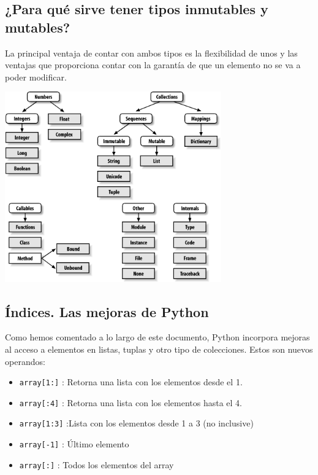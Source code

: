 \documentclass[12pt]{article} %
\begin{document}
\subsection{¿Para qué sirve tener tipos inmutables y mutables?}
La principal ventaja de contar con ambos tipos es la flexibilidad de unos y las ventajas que proporciona contar con la garantía de que un elemento no se va a poder modificar.
\begin{center}
	\includegraphics[width=0.7\textwidth]{tree.png}
\end{center}

\subsection{Índices. Las mejoras de Python}
Como hemos comentado a lo largo de este documento, Python incorpora mejoras al acceso a elementos en listas, tuplas y otro tipo de colecciones. Estos son nuevos operandos:
\begin{itemize}
	\item \verb+array[1:]+ : Retorna una lista con los elementos desde el 1.
	\item \verb+array[:4]+ : Retorna una lista con los elementos hasta el 4.
	\item \verb+array[1:3]+ :Lista con los elementos desde 1 a 3 (no inclusive)
	\item \verb+array[-1]+ : Último elemento
	\item \verb+array[:]+ : Todos los elementos del array
\end{itemize}
\end{document}
